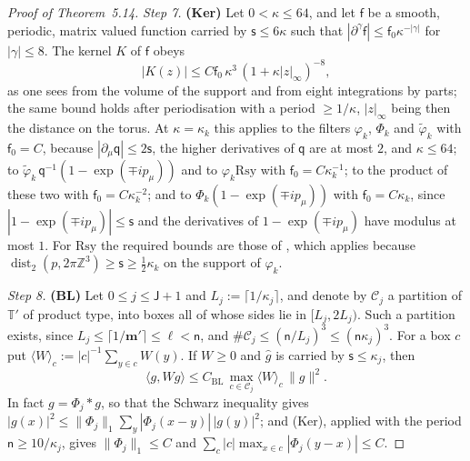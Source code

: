 \documentclass[11pt,letterpaper,reqno]{amsart}
\theoremstyle{definition}
\begin{document}
\begin{proof}[Proof of Theorem~5.14]
\emph{Step 7.}
\textbf{(Ker)} Let $0<\kappa\le64$, and let $\mathsf f$ be a smooth, periodic, matrix valued function carried by $\mathsf s\le6\kappa$ such that $|\partial^\gamma\mathsf f|\le\mathsf f_0\kappa^{-|\gamma|}$ for $|\gamma|\le8$.
The kernel $K$ of $\mathsf f$ obeys
\begin{equation*}
|K(z)|\le C\mathsf f_0\,\kappa^3\,(1+\kappa|z|_\infty)^{-8},
\end{equation*}
as one sees from the volume of the support and from eight integrations by parts;
the same bound holds after periodisation with a period $\ge1/\kappa$, $|z|_\infty$ being then the distance on the torus.
At $\kappa=\kappa_k$ this applies to the filters $\varphi_k$, $\Phi_k$ and $\tilde\varphi_k$ with $\mathsf f_0=C$, because $|\partial_\mu\mathsf q|\le2\mathsf s$, the higher derivatives of $\mathsf q$ are at most $2$, and $\kappa\le64$;
to $\tilde\varphi_k\,\mathsf q^{-1}(1-\exp(\mp ip_\mu))$ and to $\varphi_k\mathrm{Rsy}$ with $\mathsf f_0=C\kappa_k^{-1}$;
to the product of these two with $\mathsf f_0=C\kappa_k^{-2}$;
and to $\Phi_k(1-\exp(\mp ip_\mu))$ with $\mathsf f_0=C\kappa_k$, since $|1-\exp(\mp ip_\mu)|\le\mathsf s$ and the derivatives of $1-\exp(\mp ip_\mu)$ have modulus at most $1$.
For $\mathrm{Rsy}$ the required bounds are those of \cite[Proposition~37.1\,(g)]{QEDIII}, which applies because $\operatorname{dist}_2(p,\allowbreak 2\pi\mathbb Z^3)\ge\mathsf s\ge\frac12\kappa_k$ on the support of $\varphi_k$.

\emph{Step 8.}
\textbf{(BL)} Let $0\le j\le\mathsf J+1$ and $L_j:=\lceil1/\kappa_j\rceil$, and denote by $\mathcal C_j$ a partition of $\mathbb T'$ of product type, into boxes all of whose sides lie in $[L_j,2L_j)$.
Such a partition exists, since $L_j\le\lceil1/\mathbf m'\rceil\le\ell<\mathsf n$, and $\#\mathcal C_j\le(\mathsf n/L_j)^3\le(\mathsf n\kappa_j)^3$.
For a box $c$ put $\langle W\rangle_c:=|c|^{-1}\sum_{y\in c}W(y)$.
If $W\ge0$ and $\hat g$ is carried by $\mathsf s\le\kappa_j$, then
\begin{equation*}
\langle g,Wg\rangle\le C_{\mathrm{BL}}\,\max_{c\in\mathcal C_j}\langle W\rangle_c\,\|g\|^2.
\end{equation*}
In fact $g=\Phi_j*g$, so that the Schwarz inequality gives $|g(x)|^2\le\|\Phi_j\|_1\sum_y|\Phi_j(x-y)|\,|g(y)|^2$;
and (Ker), applied with the period $\mathsf n\ge10/\kappa_j$, gives $\|\Phi_j\|_1\le C$ and $\sum_c|c|\max_{x\in c}|\Phi_j(y-x)|\le C$.


\end{proof}
\end{document}
